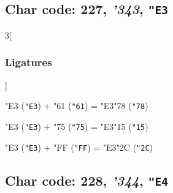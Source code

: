 \documentclass{article}
\newlength{\maxcharwidth}
\begin{document}
\subsection{Char code: 227, {\it'343}, {\tt"E3}}
\label{char_227}


\begin{multicols}{3}[\subsubsection{Ligatures}]

{\testfont\char"E3\noboundary} ({\tt"E3}) + {\testfont\char"61\noboundary} ({\tt"61}) = {\testfont\char"E3\noboundary}{\testfont\char"78\noboundary} ({\tt"78}) 

{\testfont\char"E3\noboundary} ({\tt"E3}) + {\testfont\char"75\noboundary} ({\tt"75}) = {\testfont\char"E3\noboundary}{\testfont\char"15\noboundary} ({\tt"15}) 

{\testfont\char"E3\noboundary} ({\tt"E3}) + {\testfont\char"FF\noboundary} ({\tt"FF}) = {\testfont\char"E3\noboundary}{\testfont\char"2C\noboundary} ({\tt"2C}) 

\end{multicols}

\subsection{Char code: 228, {\it'344}, {\tt"E4}}
\label{char_228}

\end{document}
